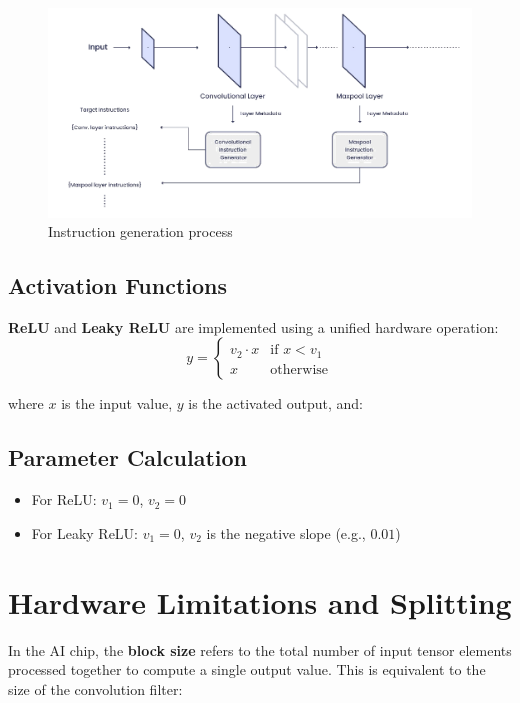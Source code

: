 \documentclass[12pt]{report}
\begin{document}
\begin{figure}[!b]
\centering
  \includegraphics[width=\textwidth]{instruction_generation1.png}
  \caption{Instruction generation process}
  \label{label2}
\end{figure}

\subsection{Activation Functions}


\textbf{ReLU} and \textbf{Leaky ReLU} are implemented using a unified hardware operation:
\[
y = 
\begin{cases}
v_2 \cdot x & \text{if } x < v_1 \\
x & \text{otherwise}
\end{cases}
\]

\noindent
where $x$ is the input value, $y$ is the activated output, and:
\subsection*{Parameter Calculation}
\begin{itemize}
    \item For ReLU: $v_1 = 0$, $v_2 = 0$
    \item For Leaky ReLU: $v_1 = 0$, $v_2$ is the negative slope (e.g., $0.01$)
\end{itemize}

\section{Hardware Limitations and Splitting}

In the AI chip, the \textbf{block size} refers to the total number of input tensor elements processed together to compute a single output value. This is equivalent to the size of the convolution filter:
\end{document}
